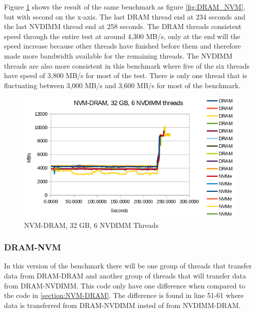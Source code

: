 \documentclass[12pt,a4paper,USenglish]{article}      %
\begin{document}
Figure \ref{fig:NVM_DRAM_sec} shows the result of the same benchmark as figure \ref{fig:DRAM_NVM}, but with second on the x-axis. The last DRAM thread end at 234 seconds and the last NVDIMM thread end at 258 seconds. The DRAM threads consistent speed through the entire test at around 4,300 MB/s, only at the end will the speed increase because other threads have finished before them and therefore made more bandwidth available for the remaining threads. The NVDIMM threads are also more consistent in this benchmark where five of the six threads have speed of 3,800 MB/s for most of the test. There is only one thread that is fluctuating between 3,000 MB/s and 3,600 MB/s for most of the benchmark.

\begin{figure}[!hbtp]
\includegraphics[scale=0.7]{Benchmarks/NVM-DRAM_32GB_6_Thread.png}
\caption{NVM-DRAM, 32 GB, 6 NVDIMM Threads}
\label{fig:NVM_DRAM_sec}
\end{figure}

\subsubsection{DRAM-NVM}
\label{section:DRAM-NVM}
In this version of the benchmark there will be one group of threads that transfer data from DRAM-DRAM and another group of threads that will transfer data from DRAM-NVDIMM. This code only have one difference when compared to the code in \ref{section:NVM-DRAM}. The difference is found in line 51-61 where data is transferred from DRAM-NVDIMM insted of from NVDIMM-DRAM.
\end{document}
